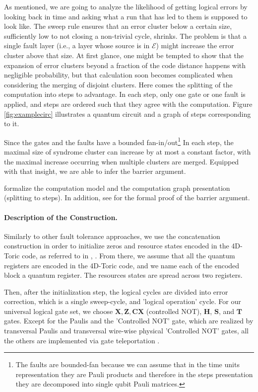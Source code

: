 
As mentioned, we are going to analyze the likelihood of getting logical errors by looking back in time and asking what a run that has led to them is supposed to look like. The sweep rule ensures that an error cluster below a certain size, sufficiently low to not closing a non-trivial cycle, shrinks. 
The problem is that a single fault layer (i.e., a layer whose source is in $\mathcal{E}$) might increase the error cluster above that size. At first glance, one might be tempted to show that the expansion of error clusters beyond a fraction of the code distance happens with negligible probability, but that calculation soon becomes complicated when considering the merging of disjoint clusters. 
Here comes the splitting of the computation into steps to advantage. In each step, only one gate or one fault is applied, and steps are ordered such that they agree with the computation. Figure \ref{fig:examplecirc} illustrates a quantum circuit and a graph of steps corresponding to it.


Since the gates and the faults have a bounded fan-in/out\footnote{The faults are bounded-fan because we can assume that in the time units representation they are Pauli products and therefore in the steps presentation they are decomposed into single qubit Pauli matrices.} In each step, the maximal size of syndrome cluster can increase by at most a constant factor, with the maximal increase occurring when multiple clusters are merged. Equipped with that insight, we are able to infer the barrier argument. 


 formalize the computation model and the computation graph presentation (splitting to steps). In addition, see  for the formal proof of the barrier argument. 

\paragraph{Description of the Construction.}
Similarly to other fault tolerance approaches, we use the concatenation construction \cite{aharonov1999faulttolerant} in order to initialize zeros and resource states encoded in the 4D-Toric code, as referred to in \cite{grospellier:tel-03364419}, \cite{gottesman2014faulttolerant}. From there, we assume that all the quantum registers are encoded in the 4D-Toric code, and we name each of the encoded block a quantum register. The resources states are spread across two registers.


Then, after the initialization step, the logical cycles are divided into error correction, which is a single sweep-cycle, and 'logical operation' cycle. For our universal logical gate set, we choose $ \mathbf{X}, \mathbf{Z}, \mathbf{CX}$ (controlled NOT), $\mathbf{H}$, $\mathbf{S}$, and $\mathbf{T}$ gates. Except for the Paulis and the 'Controlled NOT' gate, which are realized by transversal Paulis and transversal wire-wise physical 'Controlled NOT' gates, all the others are implemented via gate teleportation \cite{Zhou_2000}.


